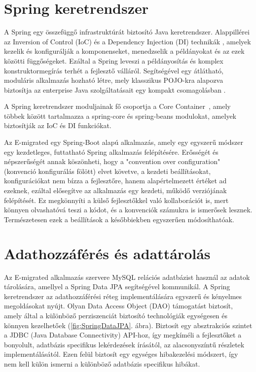 \begin{reviewed}
\section{Spring keretrendszer}
\label{subsec:Spring}

A Spring egy összefüggő infrastruktúrát biztosító Java keretrendszer.  Alappillérei az Inversion of Control (IoC) és a Dependency Injection (DI) technikák \cite{IoCDI}, amelyek kezelik és konfigurálják a komponenseket, menedzselik a példányokat és az ezek közötti függőségeket. Ezáltal a Spring leveszi a példányosítás és komplex konstruktormegírás terhét a fejlesztő válláról. Segítségével egy átlátható, moduláris alkalmazás hozható létre, mely klasszikus POJO-kra alapozva biztosítja az enterprise Java szolgáltatásait egy kompakt csomagolásban \cite{Spring}. 

A Spring keretrendszer moduljainak fő csoportja a Core Container~\cite{SpringCore}, amely többek között tartalmazza  a spring-core és spring-beans modulokat, amelyek biztosítják az IoC és DI funkciókat.

Az E-migrated egy Spring-Boot alapú alkalmazás, amely egy egyszerű módszer egy kezdetleges, futtatható Spring alkalmazás felépítésére. Erősségét és népszerűségét annak köszönheti, hogy a "convention over configuration" \cite{Convention} (konvenció konfigurálás fölött) elvet követve, a kezdeti beállításokat, konfigurációkat nem bízza a fejlesztőre, hanem alapértelmezett értéket ad ezeknek, ezáltal elősegítve az alkalmazás egy kezdeti, működő verziójának felépítését. Ez megkönnyíti a külső fejlesztőkkel való kollaborációt is, mert könnyen olvashatóvá teszi a kódot, és a konvenciók számukra is ismerősek lesznek. Természetesen ezek a beállítások a későbbiekben egyszerűen módosíthatóak.\cite{SpringBoot}
\section{Adathozzáférés és adattárolás}
\label{subsec:Adathozzáférés}
Az E-migrated alkalmazás szervere MySQL relációs adatbázist használ az adatok tárolására, amellyel a Spring Data JPA segítségével kommunikál. A Spring keretrendszer az adathozzáférési réteg implementálására egyszerű és kényelmes megoldásokat nyújt. Olyan Data Access Object (DAO) támogatást biztosít, amely által a különböző  perziszenciát biztosító technológiák egységesen és könnyen kezelhetőek (\ref{fig:SpringDataJPA}. ábra). Biztosít egy absztrakciós szintet a  JDBC (Java Database Connectivity) API-hoz, így megkíméli a fejlesztőket a bonyolult, adatbázis specifikus lekérdezések írásától, az alacsonyszíntű részletek implementálásától. Ezen felül biztosít egy egységes hibakezelési módszert, így nem kell külön ismerni a különböző adatbázis specifikus hibákat. 


\end{reviewed}
